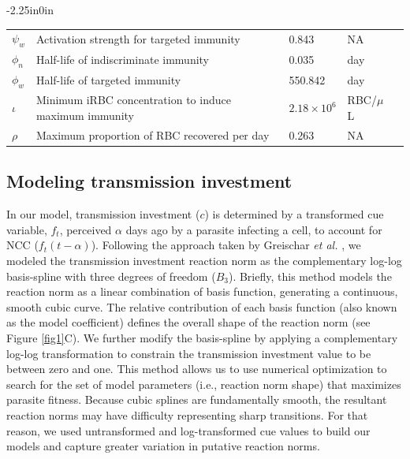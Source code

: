\documentclass[10pt,letterpaper]{article}
\begin{document}
\begin{table}[!ht]
\begin{adjustwidth}{-2.25in}{0in}
\begin{tabular}{@{}lllll@{}}
$\psi_{w}$   & Activation strength for targeted immunity              & 0.843                     & NA         & \cite{kamiya_uncovering_2020}      \\
$\phi_{n}$   & Half-life of indiscriminate immunity                   & 0.035                    & day        & \cite{kamiya_uncovering_2020}      \\
$\phi_{w}$   & Half-life of targeted immunity                         & 550.842                       & day        & \cite{kamiya_uncovering_2020}      \\
$\iota$ & Minimum iRBC concentration to induce maximum immunity                 & $2.18\times10^6$ & RBC/$\mu$L     & \cite{timms_effect_2001} \\
$\rho$  & Maximum proportion of RBC recovered per day & 0.263                    & NA & \cite{kamiya_uncovering_2020} \\ \bottomrule
\end{tabular}
\begin{flushleft}
\end{flushleft}
\label{table2}
\end{adjustwidth}
\end{table}

\subsection*{Modeling transmission investment}
In our model, transmission investment ($c$) is determined by a transformed cue variable, $f_{t}$, perceived $\alpha$ days ago by a parasite infecting a cell, to account for NCC ($f_{t}(t-\alpha)$). Following the approach taken by Greischar \emph{et al.} \cite{greischar_predicting_2016}, we modeled the transmission investment reaction norm as the complementary log-log basis-spline with three degrees of freedom ($B_{3}$). Briefly, this method models the reaction norm as a linear combination of basis function, generating a continuous, smooth cubic curve. The relative contribution of each basis function (also known as the model coefficient) defines the overall shape of the reaction norm (see Figure \ref{fig1}C). We further modify the basis-spline by applying a complementary log-log transformation to constrain the transmission investment value to be between zero and one. This method allows us to use numerical optimization to search for the set of model parameters (i.e., reaction norm shape) that maximizes parasite fitness. Because cubic splines are fundamentally smooth, the resultant reaction norms may have difficulty representing sharp transitions. For that reason, we used untransformed and log-transformed cue values to build our models and capture greater variation in putative reaction norms. \newline
\end{document}

